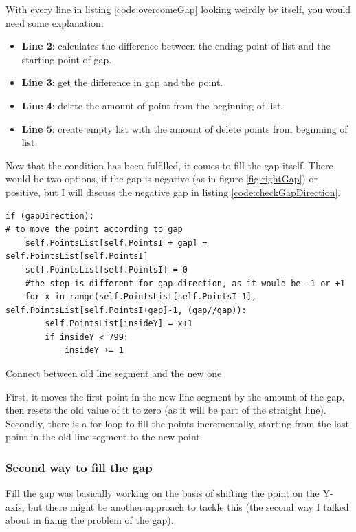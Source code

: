 With every line in listing \ref{code:overcomeGap} looking weirdly by itself, you would need some explanation:

\begin{itemize}
	\item \textbf{Line 2}: calculates the difference between the ending point of list and the starting point of gap.
	\item \textbf{Line 3}: get the difference in gap and the point.
	\item \textbf{Line 4}: delete the amount of point from the beginning of list.
	\item \textbf{Line 5}: create empty list with the amount of delete points from beginning of list.
\end{itemize}

Now that the condition has been fulfilled, it comes to fill the gap itself. There would be two options, if the gap is negative (as in figure \ref{fig:rightGap}) or positive, but I will discuss the negative gap in listing \ref{code:checkGapDirection}.

\begin{listing}[H]
	\begin{verbatim}
if (gapDirection):
# to move the point according to gap
	self.PointsList[self.PointsI + gap] = self.PointsList[self.PointsI]
	self.PointsList[self.PointsI] = 0
	#the step is different for gap direction, as it would be -1 or +1
	for x in range(self.PointsList[self.PointsI-1], self.PointsList[self.PointsI+gap]-1, (gap//gap)):
		self.PointsList[insideY] = x+1
		if insideY < 799:
			insideY += 1
	\end{verbatim}
\caption{Connect between old line segment and the new one}
\label{code:checkGapDirection}
\end{listing}

First, it moves the first point in the new line segment by the amount of the gap, then resets the old value of it to zero (as it will be part of the straight line). Secondly, there is a for loop to fill the points incrementally, starting from the last point in the old line segment to the new point.

\subsubsection{Second way to fill the gap}

Fill the gap was basically working on the basis of shifting the point on the Y-axis, but there might be another approach to tackle this (the second way I talked about in fixing the problem of the gap).

